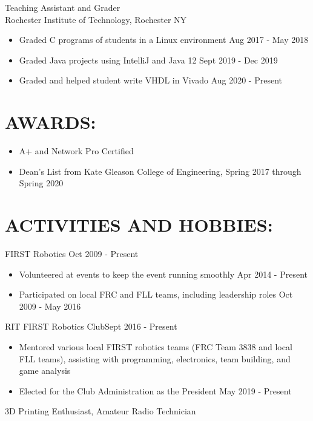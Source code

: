 \documentclass[line,margin]{res}
\begin{document}
\begin{resume}
		Teaching Assistant and Grader\\
		Rochester Institute of Technology, Rochester NY
		\begin{itemize}
			\item Graded C programs of students in a Linux environment \hfill Aug 2017 - May 2018
			\item Graded Java projects using IntelliJ and Java 12 \hfill Sept 2019 - Dec 2019
			\item Graded and helped student write VHDL in Vivado \hfill Aug 2020 - Present
		\end{itemize}

	\section{AWARDS:}
		\begin{itemize}
			\setlength{\itemindent}{-15pt}
			\item A+ and Network Pro Certified
			\item Dean's List from Kate Gleason College of Engineering, Spring 2017 through Spring 2020
		\end{itemize}

	\section{ACTIVITIES AND HOBBIES:}

		FIRST Robotics \hfill Oct 2009 - Present
		\begin{itemize}
			\item Volunteered at events to keep the event running smoothly \hfill Apr 2014 - Present
			\item Participated on local FRC and FLL teams, including leadership roles \hfill Oct 2009 - May 2016
		\end{itemize}
		\vspace{-8pt}

		RIT FIRST Robotics Club\hfill Sept 2016 - Present
		\begin{itemize}
			\item Mentored various local FIRST robotics teams (FRC Team 3838 and local FLL teams), assisting with programming, electronics, team building, and game analysis
			\item Elected for the Club Administration as the President \hfill May 2019 - Present
		\end{itemize}
		\vspace{-8pt}

		3D Printing Enthusiast,  Amateur Radio Technician
		
\end{resume}
\end{document}
